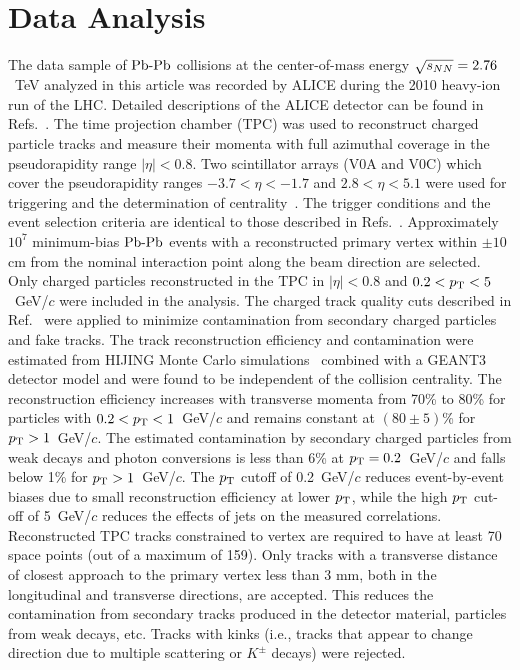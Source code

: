 \section{Data Analysis}
\label{sec:experiment}
The data sample of $\textnormal{Pb-Pb}$ collisions at the center-of-mass energy $\sqrt{s_{NN}}=2.76$~TeV analyzed in this article was recorded by ALICE during the 2010 heavy-ion run of the LHC.
Detailed descriptions of the ALICE detector can be found
in Refs.~\cite{Aamodt:2008zz,Carminati:2004fp,Alessandro:2006yt}. The time
projection chamber (TPC) was used to reconstruct charged particle
tracks and measure their momenta with full azimuthal coverage in the
pseudorapidity range $|\eta|<0.8$. Two scintillator
arrays (V0A and V0C) which cover the pseudorapidity  ranges $-3.7<\eta<-1.7$
and $2.8<\eta<5.1$ were used for triggering and the determination of
centrality~\cite{Aamodt:2010cz}. The trigger
conditions and the event selection criteria are identical to those
described in Refs.~\cite{Aamodt:2010pa, Aamodt:2010cz}.
Approximately $10^7$ minimum-bias $\textnormal{Pb-Pb}$ events with
a reconstructed primary vertex within $\pm 10$ cm from the nominal
interaction point along the beam direction are selected. Only charged particles reconstructed in the TPC in $|\eta|<0.8$
and $0.2<p_{\rm T}<5$~GeV/$c$ were included in the analysis. The charged track quality cuts
described in Ref.~\cite{Aamodt:2010pa} were applied to minimize
contamination from secondary charged particles and fake tracks.
The track reconstruction efficiency and contamination
were estimated from HIJING Monte Carlo
simulations~\cite{Wang:1991hta} combined with a GEANT3~\cite{Brun:1994aa} detector model and were found to be independent of
the collision centrality. The reconstruction efficiency increases with transverse momenta from
70\% to 80\% for particles with $0.2<p_{\rm T}<1$~GeV/$c$ and remains
constant at $(80 \pm 5)$\% for $p_{\rm T}>1$~GeV/$c$. The estimated
contamination by secondary charged particles from weak decays and
photon conversions is less than 6\% at $p_{\rm T}=0.2$~GeV/$c$ and falls
below 1\% for $p_{\rm T}>1$~GeV/$c$.
The $p_{\rm T}$ cutoff of 0.2~GeV/$c$ reduces event-by-event biases due to small reconstruction efficiency 
at lower $p_{\rm T}$, while the high $p_{\rm T}$ cut-off of 5~GeV/$c$ reduces the effects of jets on the measured correlations. 
Reconstructed TPC tracks constrained to vertex are required to have at least 70 space points (out of a maximum of 159). 
Only tracks with a transverse distance of closest approach to the primary vertex less than 3 mm, both in the longitudinal and transverse directions, are accepted. This reduces the contamination from secondary tracks produced in the detector material, particles from weak decays, etc. Tracks with kinks (i.e., tracks that appear to change direction due to multiple scattering or $K^{\pm}$ decays) were rejected.


